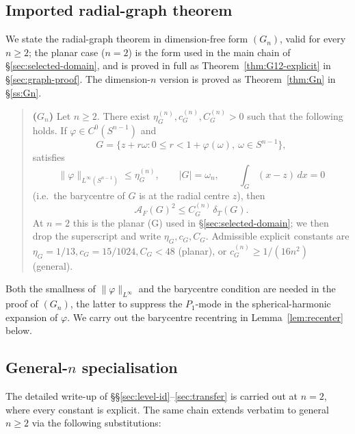 \documentclass[11pt]{amsart}
\newcommand{\dT}{\delta_T}
\newcommand{\AF}{\mathcal A_F}
\begin{document}
\subsection{Imported radial-graph theorem}\label{ss:G-import}

We state the radial-graph theorem in dimension-free form
$(G_n)$, valid for every $n\ge 2$; the planar case ($n=2$) is the
form used in the main chain of \S\ref{sec:selected-domain}, and
is proved in full as Theorem~\ref{thm:G12-explicit} in
\S\ref{sec:graph-proof}.  The dimension-$n$ version is proved as
Theorem~\ref{thm:Gn} in \S\ref{ss:Gn}.

\begin{quote}
\textbf{($G_n$)} Let $n\ge 2$.  There exist
$\eta_G^{(n)},c_G^{(n)},C_G^{(n)}>0$ such that the following holds.
If $\varphi\in C^0(S^{n-1})$ and
\[
   G=\{z+r\omega:0\le r<1+\varphi(\omega),\ \omega\in S^{n-1}\},
\]
satisfies
\[
   \|\varphi\|_{L^\infty(S^{n-1})}\le\eta_G^{(n)},
   \qquad
   |G|=\omega_n,
   \qquad
   \int_G(x-z)\,dx=0
\]
\textup{(i.e.\ the barycentre of $G$ is at the radial centre $z$)},
then
\begin{equation}\label{eq:graph-theorem}
   \AF(G)^{2}\le C_G^{(n)}\,\dT(G).
\end{equation}
At $n=2$ this is the planar (G) used in
\S\ref{sec:selected-domain}; we then drop the superscript and write
$\eta_G,c_G,C_G$.  Admissible explicit constants are
$\eta_G=1/13,c_G=15/1024,C_G<48$ (planar), or
$c_G^{(n)}\ge 1/(16 n^{2})$ (general).
\end{quote}

Both the smallness of $\|\varphi\|_{L^\infty}$ and the barycentre
condition are needed in the proof of $(G_n)$, the latter to suppress
the $P_1$-mode in the spherical-harmonic expansion of $\varphi$.  We
carry out the barycentre recentring in
Lemma~\ref{lem:recenter} below.

\subsection{General-\texorpdfstring{$n$}{n} specialisation}
\label{ss:general-n}

The detailed write-up of \S\S\ref{sec:level-id}--\ref{sec:transfer}
is carried out at $n=2$, where every constant is explicit.  The same
chain extends verbatim to general $n\ge 2$ via the following
substitutions:
\end{document}
